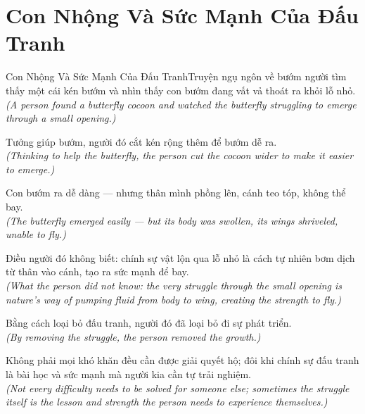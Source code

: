 \section{Con Nhộng Và Sức Mạnh Của Đấu Tranh}
\begin{truyen}{Con Nhộng Và Sức Mạnh Của Đấu Tranh}{Truyện ngụ ngôn về bướm}
 người tìm thấy một cái kén bướm và nhìn thấy con bướm đang vất vả thoát ra khỏi lỗ nhỏ.\\[4pt]
\textit{(A person found a butterfly cocoon and watched the butterfly struggling to emerge through a small opening.)}

Tưởng giúp bướm, người đó cắt kén rộng thêm để bướm dễ ra.\\[4pt]
\textit{(Thinking to help the butterfly, the person cut the cocoon wider to make it easier to emerge.)}

Con bướm ra dễ dàng --- nhưng thân mình phồng lên, cánh teo tóp, không thể bay.\\[4pt]
\textit{(The butterfly emerged easily --- but its body was swollen, its wings shriveled, unable to fly.)}

Điều người đó không biết: chính sự vật lộn qua lỗ nhỏ là cách tự nhiên bơm dịch từ thân vào cánh, tạo ra sức mạnh để bay.\\[4pt]
\textit{(What the person did not know: the very struggle through the small opening is nature's way of pumping fluid from body to wing, creating the strength to fly.)}

Bằng cách loại bỏ đấu tranh, người đó đã loại bỏ đi sự phát triển.\\[4pt]
\textit{(By removing the struggle, the person removed the growth.)}

\end{truyen}
\begin{baihoc}
  Không phải mọi khó khăn đều cần được giải quyết hộ; đôi khi chính sự đấu tranh là bài học và sức mạnh mà người kia cần tự trải nghiệm.\\[4pt]
  \textit{(Not every difficulty needs to be solved for someone else; sometimes the struggle itself is the lesson and strength the person needs to experience themselves.)}
\end{baihoc}

